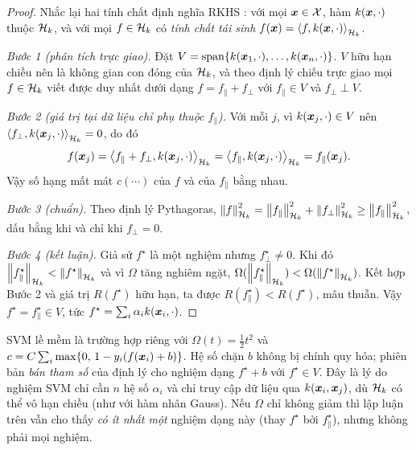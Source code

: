 \begin{proof}
Nhắc lại hai tính chất định nghĩa RKHS \citep{aronszajn1950theory}: với mọi $\bm{x} \in \mathcal{X}$,
hàm $k(\bm{x}, \cdot)$ thuộc $\mathcal{H}_k$, và với mọi $f \in \mathcal{H}_k$ có \emph{tính chất tái sinh}
$f(\bm{x}) = \left\langle f, k(\bm{x}, \cdot) \right\rangle_{\mathcal{H}_k}$.

\emph{Bước 1 (phân tích trực giao).} Đặt $V = \operatorname{span}\{k(\bm{x}_1, \cdot), \dots, k(\bm{x}_n, \cdot)\}$.
$V$ hữu hạn chiều nên là không gian con đóng của $\mathcal{H}_k$, và theo định lý chiếu trực giao mọi
$f \in \mathcal{H}_k$ viết được duy nhất dưới dạng $f = f_\parallel + f_\perp$ với $f_\parallel \in V$ và
$f_\perp \perp V$.

\emph{Bước 2 (giá trị tại dữ liệu chỉ phụ thuộc $f_\parallel$).} Với mỗi $j$, vì
$k(\bm{x}_j, \cdot) \in V$ nên $\left\langle f_\perp, k(\bm{x}_j, \cdot) \right\rangle_{\mathcal{H}_k} = 0$, do đó
\[
  f(\bm{x}_j) = \left\langle f_\parallel + f_\perp, k(\bm{x}_j, \cdot) \right\rangle_{\mathcal{H}_k}
  = \left\langle f_\parallel, k(\bm{x}_j, \cdot) \right\rangle_{\mathcal{H}_k} = f_\parallel(\bm{x}_j).
\]
Vậy số hạng mất mát $c(\cdots)$ của $f$ và của $f_\parallel$ bằng nhau.

\emph{Bước 3 (chuẩn).} Theo định lý Pythagoras,
$\left\lVert f \right\rVert_{\mathcal{H}_k}^2 = \left\lVert f_\parallel \right\rVert_{\mathcal{H}_k}^2 + \left\lVert f_\perp \right\rVert_{\mathcal{H}_k}^2 \ge \left\lVert f_\parallel \right\rVert_{\mathcal{H}_k}^2$, dấu bằng
khi và chỉ khi $f_\perp = 0$.

\emph{Bước 4 (kết luận).} Giả sử $f^\star$ là một nghiệm nhưng $f^\star_\perp \ne 0$. Khi đó
$\left\lVert f^\star_\parallel \right\rVert_{\mathcal{H}_k} < \left\lVert f^\star \right\rVert_{\mathcal{H}_k}$ và vì $\Omega$ tăng nghiêm ngặt,
$\Omega(\left\lVert f^\star_\parallel \right\rVert_{\mathcal{H}_k}) < \Omega(\left\lVert f^\star \right\rVert_{\mathcal{H}_k})$. Kết hợp Bước 2 và giá trị
$R(f^\star)$ hữu hạn, ta được $R(f^\star_\parallel) < R(f^\star)$, mâu thuẫn. Vậy
$f^\star = f^\star_\parallel \in V$, tức $f^\star = \sum_i \alpha_i k(\bm{x}_i, \cdot)$.
\end{proof}

\begin{remark}
SVM lề mềm là trường hợp riêng với $\Omega(t) = \frac12 t^2$ và
$c = C\sum_i \max\{0,\, 1 - y_i(f(\bm{x}_i) + b)\}$. Hệ số chặn $b$ không bị chính quy hóa; phiên bản
\emph{bán tham số} của định lý \citep{scholkopf2001generalized} cho nghiệm dạng
$f^\star + b$ với $f^\star \in V$. Đây là lý do nghiệm SVM chỉ cần $n$ hệ số $\alpha_i$ và chỉ
truy cập dữ liệu qua $k(\bm{x}_i, \bm{x}_j)$, dù $\mathcal{H}_k$ có thể vô hạn chiều (như với hàm nhân Gauss).
Nếu $\Omega$ chỉ không giảm thì lập luận trên vẫn cho thấy \emph{có ít nhất một} nghiệm dạng
này (thay $f^\star$ bởi $f^\star_\parallel$), nhưng không phải mọi nghiệm.
\end{remark}


